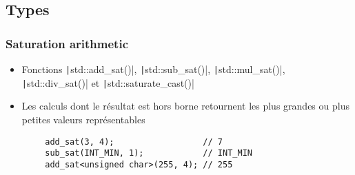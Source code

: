 \documentclass[C++.tex]{subfiles}
\begin{document}
\subsection*{Types}
\begin{frame}[fragile]
	\frametitle{Saturation arithmetic}
	\begin{itemize}
		\item Fonctions \texttt|std::add_sat()|, \texttt|std::sub_sat()|, \texttt|std::mul_sat()|, \texttt|std::div_sat()| et \texttt|std::saturate_cast()|
		\item Les calculs dont le résultat est hors borne retournent les plus grandes ou plus petites valeurs représentables
	\end{itemize}

	\begin{verbatim}
		add_sat(3, 4);                  // 7
		sub_sat(INT_MIN, 1);            // INT_MIN
		add_sat<unsigned char>(255, 4); // 255
	\end{verbatim}


\end{frame}
\end{document}
